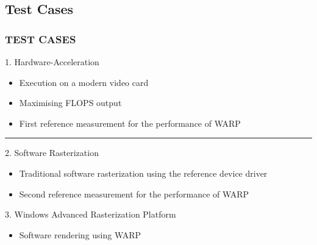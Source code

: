 \subsection{Test Cases}
\begin{frame}
\frametitle{TEST CASES}

\begin{block}{1. Hardware-Acceleration}
  \begin{itemize}
  \item Execution on a modern video card
  \item Maximising FLOPS output
  \item First reference measurement for the performance of WARP
  \end{itemize}
\end{block}
\noindent\rule{11cm}{0.4pt}
\begin{block}{2. Software Rasterization}
  \begin{itemize}
  \item Traditional software rasterization using the reference device driver
  \item Second reference measurement for the performance of WARP
  \end{itemize}
\end{block}
\begin{block}{3. Windows Advanced Rasterization Platform}
  \begin{itemize}
  \item Software rendering using WARP
  \end{itemize}
\end{block}

\end{frame}

